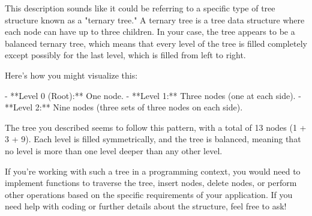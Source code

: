 This description sounds like it could be referring to a specific type of tree structure known as a "ternary tree." A ternary tree is a tree data structure where each node can have up to three children. In your case, the tree appears to be a balanced ternary tree, which means that every level of the tree is filled completely except possibly for the last level, which is filled from left to right.

Here's how you might visualize this:

- **Level 0 (Root):** One node.
- **Level 1:** Three nodes (one at each side).
- **Level 2:** Nine nodes (three sets of three nodes on each side).

The tree you described seems to follow this pattern, with a total of 13 nodes (1 + 3 + 9). Each level is filled symmetrically, and the tree is balanced, meaning that no level is more than one level deeper than any other level.

If you're working with such a tree in a programming context, you would need to implement functions to traverse the tree, insert nodes, delete nodes, or perform other operations based on the specific requirements of your application. If you need help with coding or further details about the structure, feel free to ask!